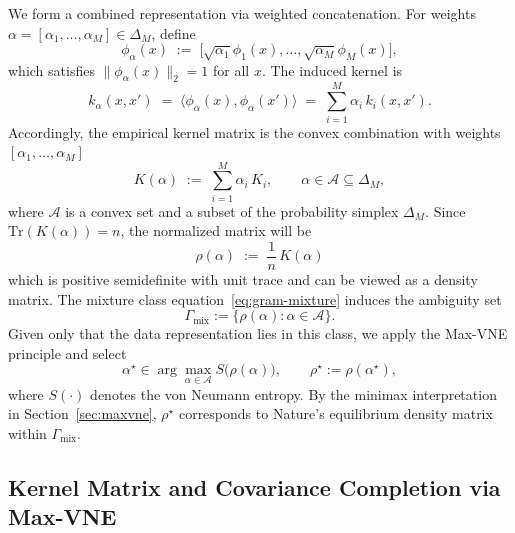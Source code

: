\documentclass{article}
\theoremstyle{plain}
\theoremstyle{definition}
\def\eqref#1{equation~\ref{#1}}
\begin{document}
We form a combined representation via weighted concatenation.
For weights \(\alpha=[\alpha_1,\dots,\alpha_M]\in\Delta_M\), define
\begin{equation}
\phi_\alpha(x)
\;:=\;
\bigl[\sqrt{\alpha_1}\phi_1(x),\dots,\sqrt{\alpha_M}\phi_M(x)\bigr],
\label{eq:concat-embedding}
\end{equation}
which satisfies \(\|\phi_\alpha(x)\|_2=1\) for all \(x\).
The induced kernel is
\begin{equation}
k_\alpha(x,x')
\;=\;
\bigl\langle \phi_\alpha(x),\phi_\alpha(x') \bigr\rangle
\;=\;
\sum_{i=1}^M \alpha_i\, k_i(x,x').
\label{eq:kernel-mixture}
\end{equation}
Accordingly, the empirical kernel matrix is the convex combination with weights $[\alpha_1,\ldots ,\alpha_M]$
\begin{equation}
K(\alpha)
\;:=\;
\sum_{i=1}^M \alpha_i\, K_i,
\qquad
\alpha\in\mathcal{A}\subseteq\Delta_M,
\label{eq:gram-mixture}
\end{equation}
where \(\mathcal{A}\) is a convex set and a subset of the probability simplex $\Delta_M$.
Since \(\mathrm{Tr}(K(\alpha))=n\), the normalized matrix will be
\begin{equation}
\rho(\alpha)
\;:=\;
\frac{1}{n}\,K(\alpha)
\label{eq:rho-alpha}
\end{equation}
which is positive semidefinite with unit trace and can be viewed as a density matrix. The mixture class \eqref{eq:gram-mixture} induces the ambiguity set
\begin{equation}
\Gamma_{\mathrm{mix}}
:=
\bigl\{\rho(\alpha): \alpha\in\mathcal{A}\bigr\}.
\label{eq:Gamma-mix-new}
\end{equation}
Given only that the data representation lies in this class, we apply the Max-VNE
principle and select
\begin{equation}
\alpha^\star \in \arg\max_{\alpha\in\mathcal{A}} S\bigl(\rho(\alpha)\bigr),
\qquad
\rho^\star := \rho(\alpha^\star),
\label{eq:maxvne-kernel-mixture}
\end{equation}
where \(S(\cdot)\) denotes the von Neumann entropy. By the minimax interpretation in Section~\ref{sec:maxvne},
\(\rho^\star\) corresponds to Nature’s equilibrium density matrix within
\(\Gamma_{\mathrm{mix}}\).%


\subsection{Kernel Matrix and Covariance Completion via Max-VNE}
\label{subsec:completion}
\end{document}
